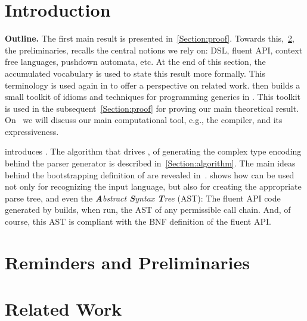 \documentclass[a4paper,USenglish]{lipics}
\author{Anonymized for the submission}
\begin{document}
\maketitle
\begin{abstract}
  
\end{abstract}

\section{Introduction}


\textbf{Outline.}
The first main result is presented in~\cref{Section:proof}.
Towards this,~\cref{Section:preliminaries}, the preliminaries, 
  recalls the central notions we rely on: DSL, fluent API,
  context free languages, pushdown automata, etc. 
At the end of this section, the accumulated vocabulary is used to state this
  result more formally.
This terminology is used again in  to offer 
  a perspective on related work.
 then builds a small toolkit of idioms and techniques
  for programming generics in \Java.
This toolkit is used in the subsequent~\cref{Section:proof} for
  proving our main theoretical result.
On~ we will discuss our main computational tool, 
  e.g., the \Java compiler, and its expressiveness.

 introduces \Self.
The algorithm that drives \Self, of generating the complex
  type encoding behind the parser generator
  is described in~\cref{Section:algorithm}.
The main ideas behind the bootstrapping definition of \Self
  are revealed in~.
 shows how \Self can be used not only
  for recognizing the input language,
  but also for creating the appropriate parse tree, and even the \emph{\textbf Abstract \textbf Syntax \textbf Tree} (AST):
  The fluent API code generated by \Self builds,
    when run, the AST of any permissible call chain.
    And, of course, this AST is compliant with the BNF definition
      of the fluent API.

\section{Reminders and Preliminaries}
\label{Section:preliminaries}


\section{Related Work}
\label{Section:related}

\end{document}
